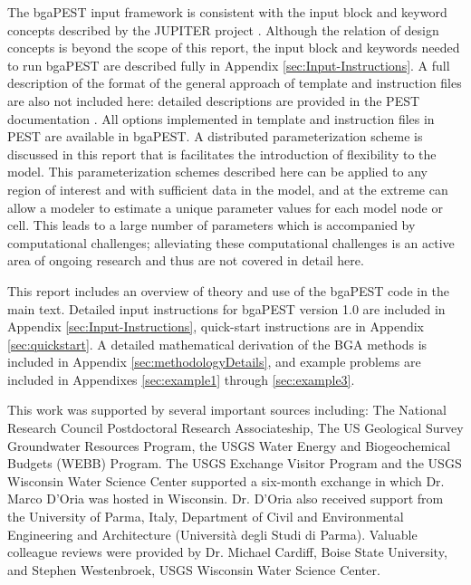 \documentclass[11pt,oneside,onecolumn]{usgsreport}
\begin{document}
\begin{multicols}{2}
\begin{bibunit}
The bgaPEST input framework is consistent with the input block and
keyword concepts described by the JUPITER project \citet{BantaEtAl2006}.
Although the relation of design concepts is beyond the scope of this
report, the input block and keywords needed to run bgaPEST are described
fully in Appendix \ref{sec:Input-Instructions}. A full description of the format of the general
approach of template and instruction files are also not included here:
detailed descriptions are provided in the PEST documentation \citep[chapter 3]{PEST}.
All options implemented in template and instruction files in PEST
are available in bgaPEST. A distributed parameterization scheme is
discussed in this report that is facilitates the introduction of 
flexibility to the model. This parameterization schemes described
here can be applied to any region of interest and with sufficient
data in the model, and at the extreme can allow a modeler to estimate
a unique parameter values for each model node or cell. This leads
to a large number of parameters which is accompanied by computational
challenges; alleviating these computational challenges is an active
area of ongoing research and thus are not covered in detail here.

This report includes an overview of theory and use of the bgaPEST
code in the main text. Detailed input instructions for bgaPEST version
1.0 are included in Appendix \ref{sec:Input-Instructions}, quick-start instructions are in Appendix
\ref{sec:quickstart}. A detailed mathematical derivation of the BGA methods is included
in Appendix \ref{sec:methodologyDetails}, and example problems are included in Appendixes \ref{sec:example1} through \ref{sec:example3}. 



This work was supported by several important sources including: The
National Research Council Postdoctoral Research Associateship, The
US Geological Survey Groundwater Resources Program, the USGS Water
Energy and Biogeochemical Budgets (WEBB) Program. The USGS Exchange
Visitor Program and the USGS Wisconsin Water Science Center supported
a six-month exchange in which Dr. Marco D'Oria was hosted in Wisconsin.
Dr. D'Oria also received support from the University of Parma, Italy,
Department of Civil and Environmental Engineering and Architecture (Universit\`{a} degli Studi di Parma).
Valuable colleague reviews were provided by Dr. Michael Cardiff, Boise
State University, and Stephen Westenbroek, USGS Wisconsin Water Science
Center. 


\end{bibunit}
\end{multicols}
\end{document}
